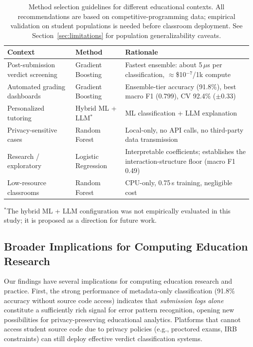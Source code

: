 \documentclass[acmsmall]{acmart}
\begin{document}
\begin{table}[htbp]
\centering
\caption{Method selection guidelines for different educational contexts. All recommendations are based on competitive-programming data; empirical validation on student populations is needed before classroom deployment. See Section~\ref{sec:limitations} for population generalizability caveats.}
\label{tab:guidelines}
\begin{tabular}{>{\raggedright\arraybackslash}p{2.8cm}
 >{\raggedright\arraybackslash}p{2.8cm}
 >{\raggedright\arraybackslash}p{6.4cm}}
\toprule
\textbf{Context} & \textbf{Method} & \textbf{Rationale} \\
\midrule
Post-submission verdict screening & Gradient Boosting & Fastest ensemble: about 5\,$\mu$s per classification, $\approx$\$10$^{-7}$/1k compute \\
Automated grading dashboards & Gradient Boosting & Ensemble-tier accuracy (91.8\%), best macro F1 (0.799), CV 92.4\% ($\pm$0.33) \\
Personalized tutoring & Hybrid ML + LLM$^{*}$ & ML classification + LLM explanation \\
Privacy-sensitive cases & Random Forest & Local-only, no API calls, no third-party data transmission \\
Research / exploratory & Logistic Regression & Interpretable coefficients; establishes the interaction-structure floor (macro F1 0.49) \\
Low-resource classrooms & Random Forest & CPU-only, 0.75\,s training, negligible cost \\
\bottomrule
\end{tabular}
{\small $^{*}$The hybrid ML + LLM configuration was not empirically evaluated in this study; it is proposed as a direction for future work.}
\end{table}

\subsection{Broader Implications for Computing Education Research}

Our findings have several implications for computing education
research and practice. First, the strong performance of metadata-only
classification (91.8\% accuracy without source code access) indicates that
\textit{submission logs alone} constitute a sufficiently rich signal for
error pattern recognition, opening new possibilities for privacy-preserving
educational analytics. Platforms that cannot access student source code
due to privacy policies (e.g., proctored exams, IRB constraints) can
still deploy effective verdict classification systems.
\end{document}
